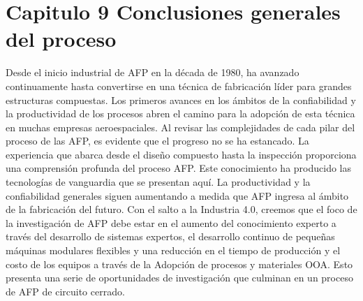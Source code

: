 \chapter{Capitulo 9 Conclusiones generales del proceso}
\label{capitulo 3}

Desde el inicio industrial de AFP en la década de 1980, ha avanzado continuamente hasta convertirse en una técnica de fabricación líder para grandes estructuras compuestas. Los primeros avances en los ámbitos de la confiabilidad y la productividad de los procesos abren el camino para la adopción de esta técnica en muchas empresas aeroespaciales. Al revisar las complejidades de cada pilar del proceso de las AFP, es evidente que el progreso no se ha estancado. La experiencia que abarca desde el diseño compuesto hasta la inspección proporciona una comprensión profunda del proceso AFP. Este conocimiento ha producido las tecnologías de vanguardia que se presentan aquí. La productividad y la confiabilidad generales siguen aumentando a medida que AFP ingresa al ámbito de la fabricación del futuro.
Con el salto a la Industria 4.0, creemos que el foco de la investigación de AFP debe estar en el aumento del conocimiento experto a través del desarrollo de sistemas expertos, el desarrollo continuo de pequeñas máquinas modulares flexibles y una reducción en el tiempo de producción y el costo de los equipos a través de la Adopción de procesos y materiales OOA. Esto presenta una serie de oportunidades de investigación que culminan en un proceso de AFP de circuito cerrado.

\textbf{}